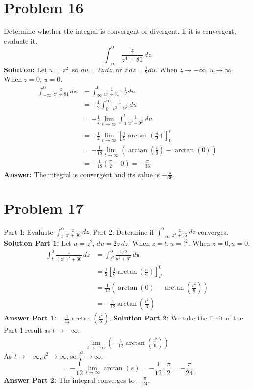 \documentclass{article}
\begin{document}
\section{Problem 16}
Determine whether the integral is convergent or divergent. If it is convergent, evaluate it.
\[ \int_{-\infty}^{0} \frac{z}{z^4+81} \,dz \]
\textbf{Solution:}
Let $u=z^2$, so $du = 2z \,dz$, or $z\,dz = \frac{1}{2}du$. When $z \to -\infty$, $u \to \infty$. When $z=0$, $u=0$.
\begin{align*}
    \int_{-\infty}^{0} \frac{z}{z^4+81} \,dz &= \int_{\infty}^{0} \frac{1}{u^2+81} \cdot \frac{1}{2}du \\
    &= -\frac{1}{2} \int_{0}^{\infty} \frac{1}{u^2+9^2} \,du \\
    &= -\frac{1}{2} \lim_{t \to \infty} \int_{0}^{t} \frac{1}{u^2+9^2} \,du \\
    &= -\frac{1}{2} \lim_{t \to \infty} \left[ \frac{1}{9}\arctan\left(\frac{u}{9}\right) \right]_0^t \\
    &= -\frac{1}{18} \lim_{t \to \infty} \left( \arctan\left(\frac{t}{9}\right) - \arctan(0) \right) \\
    &= -\frac{1}{18} \left( \frac{\pi}{2} - 0 \right) = -\frac{\pi}{36}
\end{align*}
\textbf{Answer:} The integral is convergent and its value is $-\frac{\pi}{36}$.

\section{Problem 17}
Part 1: Evaluate $\int_{t}^{0} \frac{z}{z^4+36} \,dz$.
Part 2: Determine if $\int_{-\infty}^{0} \frac{z}{z^4+36} \,dz$ converges.
\textbf{Solution Part 1:}
Let $u=z^2$, $du=2z\,dz$. When $z=t, u=t^2$. When $z=0, u=0$.
\begin{align*}
    \int_{t}^{0} \frac{z}{(z^2)^2+36} \,dz &= \int_{t^2}^{0} \frac{1/2}{u^2+6^2} \,du \\
    &= \frac{1}{2} \left[ \frac{1}{6}\arctan\left(\frac{u}{6}\right) \right]_{t^2}^0 \\
    &= \frac{1}{12} \left( \arctan(0) - \arctan\left(\frac{t^2}{6}\right) \right) \\
    &= -\frac{1}{12}\arctan\left(\frac{t^2}{6}\right)
\end{align*}
\textbf{Answer Part 1:} $-\frac{1}{12}\arctan\left(\frac{t^2}{6}\right)$.
\textbf{Solution Part 2:}
We take the limit of the Part 1 result as $t \to -\infty$.
\begin{align*}
    \lim_{t \to -\infty} \left( -\frac{1}{12}\arctan\left(\frac{t^2}{6}\right) \right)
\end{align*}
As $t \to -\infty$, $t^2 \to \infty$, so $\frac{t^2}{6} \to \infty$.
\[ = -\frac{1}{12} \lim_{s \to \infty} \arctan(s) = -\frac{1}{12} \cdot \frac{\pi}{2} = -\frac{\pi}{24} \]
\textbf{Answer Part 2:} The integral converges to $-\frac{\pi}{24}$.
\end{document}
